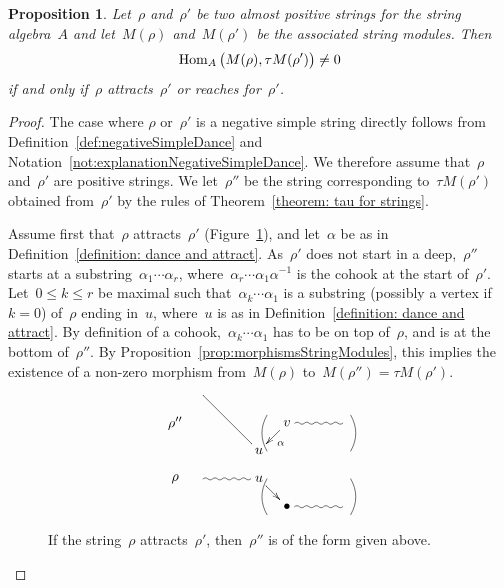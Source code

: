 \documentclass{memo-l}
\newtheorem{proposition}[theorem]{Proposition}
\theoremstyle{definition}
\newcommand{\Hom}[1]{\operatorname{{\rm Hom}}_{#1}}
\begin{document}
\enlargethispage{.5cm}

\begin{proposition}
\label{proposition: attract or dance and tau compatibility}
Let~$\rho$ and~$\rho'$ be two almost positive strings for the string algebra~$A$ and let~$M(\rho)$ and~$M(\rho')$ be the associated string modules.
Then \[\Hom{A} \big( M(\rho), \tau M(\rho') \big) \ne 0\] if and only if~$\rho$ attracts~$\rho'$ or reaches for~$\rho'$.
\end{proposition}

\begin{proof}
The case where $\rho$ or~$\rho'$ is a negative simple string directly follows from Definition~\ref{def:negativeSimpleDance} and Notation~\ref{not:explanationNegativeSimpleDance}.
We therefore assume that~$\rho$ and~$\rho'$ are positive strings.
We let~$\rho''$ be the string corresponding to~$\tau M(\rho')$ obtained from~$\rho'$ by the rules of Theorem~\ref{theorem: tau for strings}.

Assume first that~$\rho$ attracts~$\rho'$ (Figure~\ref{fig:rho attracts rho'}), and let~$\alpha$ be as in Definition~\ref{definition: dance and attract}.
As~$\rho'$ does not start in a deep,~$\rho''$ starts at a substring~$\alpha_1\cdots\alpha_r$, where~$\alpha_r\cdots\alpha_1\alpha^{-1}$ is the cohook at the start of~$\rho'$.
Let~$0\leq k\leq r$ be maximal such that~$\alpha_k\cdots\alpha_1$ is a substring (possibly a vertex if $k=0$) of~$\rho$ ending in~$u$, where~$u$ is as in Definition~\ref{definition: dance and attract}.
By definition of a cohook,~$\alpha_k\cdots\alpha_1$ has to be on top of~$\rho$, and is at the bottom of~$\rho''$.
By Proposition~\ref{prop:morphismsStringModules}, this implies the existence of a non-zero morphism from~$M(\rho)$ to~$M(\rho'') = \tau M(\rho')$.

\begin{figure}[h]
\[
\xy
%
(7,14)="peak";
%
(0,7)*+{\rho''}="10";
(28,7)*+{v}="14";
(42,7)="16";
%
(21,0)*+{u}="3";
%
(0,-7)*+{\rho}="-0";
(7,-7)="-1";
(21,-7)*+{u}="-3";
%
(28,-14)*+{\bullet}="-14";
(42,-14)="-16";
%
{\ar@{~} "-1";"-3"};
{\ar "-3";"-14"};
{\ar@{~} "-14";"-16"};
%
{\ar@{~} "14";"16"};
%
{\ar^{\alpha} "14";"3"};
{\ar@{-} "peak";"3"};
%
{\ar@/_.3pc/@{-} (23,9);(23,0)};
{\ar@/^.3pc/@{-} (44,9);(44,0)};
%
{\ar@/_.3pc/@{-} (23,-7);(23,-16)};
{\ar@/^.3pc/@{-} (44,-7);(44,-16)};
%
\endxy
\]
    \caption{If the string~$\rho$ attracts~$\rho'$, then~$\rho''$ is of the form given above.}
    \vspace{-.5cm}
    \label{fig:rho attracts rho'}
\end{figure}


\end{proof}
\end{document}
